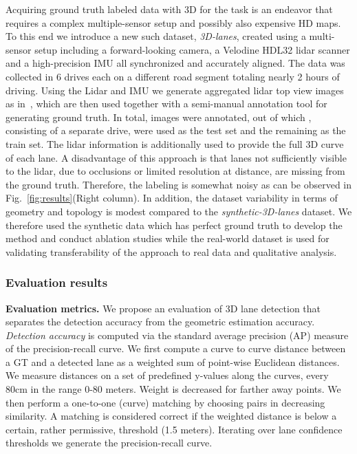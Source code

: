 \documentclass[10pt,twocolumn,letterpaper]{article}
\begin{document}
Acquiring ground truth labeled data with 3D for the task is an endeavor that requires a complex multiple-sensor setup and possibly also expensive HD maps. To this end we introduce a new such dataset, \textit{3D-lanes}, created using a multi-sensor setup including a forward-looking camera, a Velodine HDL32 lidar scanner and a high-precision IMU all synchronized and accurately aligned. The data was collected in 6 drives each on a different road segment totaling nearly 2 hours of driving. Using the Lidar and IMU we generate aggregated lidar top view images as in~\cite{Urmson_boss}, which are then used together with a semi-manual annotation tool for generating ground truth. In total,  images were annotated, out of which , consisting of a separate drive, were used as the test set and the remaining as the train set. The lidar information is additionally used to provide the full 3D curve of each lane. A disadvantage of this approach is that lanes not sufficiently visible to the lidar, due to occlusions or limited resolution at distance, are missing from the ground truth. Therefore, the labeling is somewhat noisy as can be observed in Fig.~\ref{fig:results}(Right column). In addition, the dataset variability in terms of geometry and topology is modest compared to the \emph{synthetic-3D-lanes} dataset. We therefore used the synthetic data which has perfect ground truth to develop the method and conduct ablation studies while the real-world dataset is used for validating transferability of the approach to real data and qualitative analysis. 

\subsubsection{Evaluation results}

\textbf{Evaluation metrics.} We propose an evaluation of 3D lane detection that separates the detection accuracy from the geometric estimation accuracy. \textit{Detection accuracy} is computed via the standard average precision (AP) measure of the precision-recall curve. We first compute a curve to curve distance between a GT and a detected lane as a weighted sum of point-wise Euclidean distances. We measure distances on a set of predefined y-values along the curves, every 80cm in the range 0-80 meters. Weight is decreased for farther away points. We then perform a one-to-one (curve) matching by choosing pairs in decreasing similarity. A matching is considered correct if the weighted distance is below a certain, rather permissive, threshold (1.5 meters). Iterating over lane confidence thresholds we generate the precision-recall curve.
\end{document}
